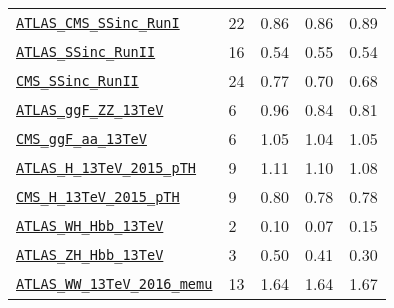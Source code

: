 \begin{table}[htbp]
\begin{tabular}{l|C{1.1cm}|C{2.1cm}|C{2.5cm}|C{2.5cm}}
 \midrule
 \href{https://arxiv.org/abs/1606.02266}{\tt ATLAS\_CMS\_SSinc\_RunI} & 22 &   0.86    & 0.86     & 0.89     \\
 \href{https://arxiv.org/abs/1909.02845}{\tt ATLAS\_SSinc\_RunII} & 16 &   0.54   &  0.55    &  0.54    \\
 \href{https://arxiv.org/abs/1809.10733}{\tt CMS\_SSinc\_RunII} & 24 &  0.77     &  0.70    &  0.68    \\
 \href{https://arxiv.org/abs/1909.02845}{\tt ATLAS\_ggF\_ZZ\_13TeV} & 6 &  0.96     &   0.84   &  0.81    \\
 \href{https://inspirehep.net/literature/1725274}{\tt CMS\_ggF\_aa\_13TeV} & 6 & 1.05   & 1.04   & 1.05     \\
 \href{http://cdsweb.cern.ch/record/2682844/files/ATLAS-CONF-2019-032.pdf}{\tt ATLAS\_H\_13TeV\_2015\_pTH} & 9 & 1.11      & 1.10     & 1.08     \\ 
 \href{https://arxiv.org/abs/1812.06504}{\tt CMS\_H\_13TeV\_2015\_pTH} & 9 &  0.80     &  0.78    & 0.78     \\
 \href{https://arxiv.org/abs/1903.04618}{\tt ATLAS\_WH\_Hbb\_13TeV} & 2 &   0.10    &  0.07    &  0.15    \\
 \href{https://arxiv.org/abs/1903.04618}{\tt ATLAS\_ZH\_Hbb\_13TeV} & 3 &   0.50    &  0.41    &  0.30    \\
 \midrule
 \href{https://arxiv.org/abs/1905.04242}{\tt ATLAS\_WW\_13TeV\_2016\_memu} & 13 & 1.64   &  1.64    &  1.67    \\

\end{tabular}
\end{table}
